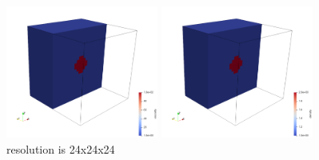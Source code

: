 \begin{center}
\includegraphics[width=5cm]{python_codes/fieldstone_10/visc}
\includegraphics[width=5cm]{python_codes/fieldstone_10/dens}\\
{\small resolution is 24x24x24}
\end{center}


